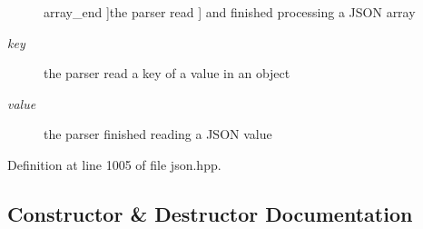 \begin{Desc}
\begin{description}
{\hypertarget{classnlohmann_1_1basic__json_aea1c863b719b4ca5b77188c171bbfafea49642fb732aa2e112188fba1f9d3ef7f}{}array\+\_\+end\label{classnlohmann_1_1basic__json_aea1c863b719b4ca5b77188c171bbfafea49642fb732aa2e112188fba1f9d3ef7f}
}]the parser read {\ttfamily \mbox{]}} and finished processing a J\+S\+O\+N array \item[{\em 
\hypertarget{classnlohmann_1_1basic__json_aea1c863b719b4ca5b77188c171bbfafea3c6e0b8a9c15224a8228b9a98ca1531d}{}key\label{classnlohmann_1_1basic__json_aea1c863b719b4ca5b77188c171bbfafea3c6e0b8a9c15224a8228b9a98ca1531d}
}]the parser read a key of a value in an object \item[{\em 
\hypertarget{classnlohmann_1_1basic__json_aea1c863b719b4ca5b77188c171bbfafea2063c1608d6e0baf80249c42e2be5804}{}value\label{classnlohmann_1_1basic__json_aea1c863b719b4ca5b77188c171bbfafea2063c1608d6e0baf80249c42e2be5804}
}]the parser finished reading a J\+S\+O\+N value \end{description}
\end{Desc}


Definition at line 1005 of file json.\+hpp.



\subsection{Constructor \& Destructor Documentation}
\hypertarget{classnlohmann_1_1basic__json_a8f77085bd98c97a983d9ba12efbf6148}{}
